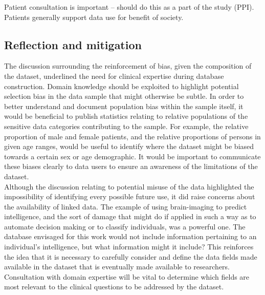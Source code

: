 \documentclass{article}
\begin{document}
Patient consultation is important -- should do this as a part of
  the study (PPI).  
 Patients generally support data use for benefit of society.

\subsection{Reflection and mitigation}
 
The discussion surrounding the reinforcement of bias, given the
composition of the dataset, underlined the need for clinical expertise
during database construction. Domain knowledge should be exploited to
highlight potential selection bias in the data sample that might
otherwise be subtle. In order to better understand and document
population bias within the sample itself, it would be beneficial to
publish statistics relating to relative populations of the sensitive data
categories contributing to the sample. For example, the relative
proportion of male and female patients, and the relative proportions
of persons in given age ranges, would be useful to identify where the dataset might be biased towards a certain
sex or age demographic.
It would be important to communicate these biases clearly to data
users to ensure an awareness of the limitations of the dataset.\\
 
Although the discussion relating to potential misuse of the data
highlighted the impossibility of identifying every possible future
use, it did raise concerns about the availability of linked data.
The example of using brain-imaging to predict intelligence, and the
sort of damage that might do if applied in such a way as to automate
decision making or to classify individuals, was a powerful one. The
database envisaged for this work would not include information
pertaining to an individual's intelligence, but what information might
it include? This reinforces the idea that it is necessary to carefully
consider and define the data fields made available in the dataset that
is eventually made available to researchers. Consultation with
domain expertise will be vital to determine which fields are most
relevant to the clinical questions to be addressed by the dataset.\\
\end{document}
